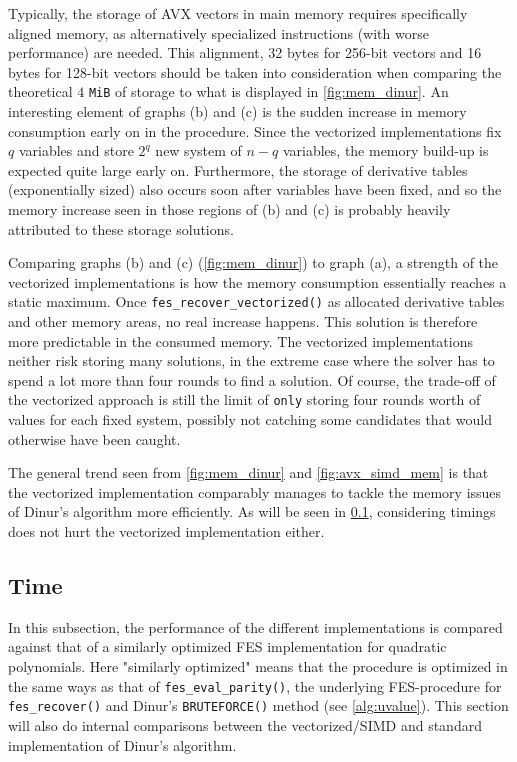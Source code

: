 Typically, the storage of AVX vectors in main memory requires specifically aligned memory, as alternatively specialized instructions (with worse performance) are needed. This alignment, 32 bytes for 256-bit vectors and 16 bytes for 128-bit vectors should be taken into consideration when comparing the theoretical $4$ \texttt{MiB} of storage to what is displayed in \cref{fig:mem_dinur}. An interesting element of graphs (b) and (c) is the sudden increase in memory consumption early on in the procedure. Since the vectorized implementations fix $q$ variables and store $2^q$ new system of $n - q$ variables, the memory build-up is expected quite large early on. Furthermore, the storage of derivative tables (exponentially sized) also occurs soon after variables have been fixed, and so the memory increase seen in those regions of (b) and (c) is probably heavily attributed to these storage solutions. 

Comparing graphs (b) and (c) (\cref{fig:mem_dinur}) to graph (a), a strength of the vectorized implementations is how the memory consumption essentially reaches a static maximum. Once \texttt{fes\_recover\_vectorized()} as allocated derivative tables and other memory areas, no real increase happens. This solution is therefore more predictable in the consumed memory. The vectorized implementations neither risk storing many solutions, in the extreme case where the solver has to spend a lot more than four rounds to find a solution. Of course, the trade-off of the vectorized approach is still the limit of \texttt{only} storing four rounds worth of values for each fixed system, possibly not catching some candidates that would otherwise have been caught.

The general trend seen from \cref{fig:mem_dinur} and \cref{fig:avx_simd_mem} is that the vectorized implementation comparably manages to tackle the memory issues of Dinur's algorithm more efficiently. As will be seen in \cref{sec:eval:dinur_fes}, considering timings does not hurt the vectorized implementation either.

\subsection{Time} \label{sec:eval:dinur_fes}
In this subsection, the performance of the different implementations is compared against that of a similarly optimized FES implementation for quadratic polynomials. Here "similarly optimized" means that the procedure is optimized in the same ways as that of \texttt{fes\_eval\_parity()}, the underlying FES-procedure for \texttt{fes\_recover()} and Dinur's \texttt{BRUTEFORCE()} method (see \cref{alg:uvalue}). This section will also do internal comparisons between the vectorized/SIMD and standard implementation of Dinur's algorithm. 

